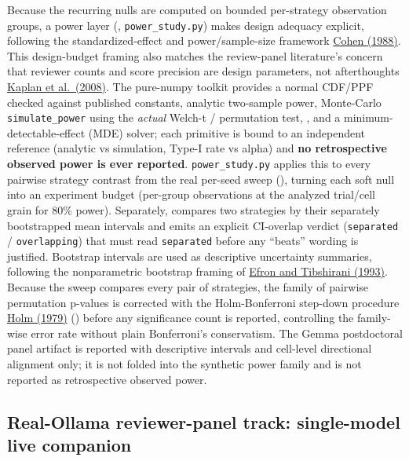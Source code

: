 \documentclass[
]{article}
\begin{document}
Because the recurring nulls are computed on bounded per-strategy
observation groups, a power layer (,
\texttt{power\_study.py}) makes design adequacy explicit, following the
standardized-effect and power/sample-size framework
\href{https://archive.org/details/statisticalpower0000cohe}{Cohen
(1988)}. This design-budget framing also matches the review-panel
literature's concern that reviewer counts and score precision are design
parameters, not afterthoughts
\href{https://doi.org/10.1371/journal.pone.0002761}{Kaplan et
al.~(2008)}. The pure-numpy toolkit provides a normal CDF/PPF checked
against published constants, analytic two-sample power, Monte-Carlo
\texttt{simulate\_power} using the \emph{actual} Welch-t / permutation
test, , and a minimum-detectable-effect
(MDE) solver; each primitive is bound to an independent reference
(analytic vs simulation, Type-I rate vs alpha) and \textbf{no
retrospective observed power is ever reported}. \texttt{power\_study.py}
applies this to every pairwise strategy contrast from the real per-seed
sweep (), turning each soft null
into an experiment budget (per-group observations at the analyzed
trial/cell grain for 80\% power). Separately,
 compares two
strategies by their separately bootstrapped mean intervals and emits an
explicit CI-overlap verdict (\texttt{separated} / \texttt{overlapping})
that must read \texttt{separated} before any ``beats'' wording is
justified. Bootstrap intervals are used as descriptive uncertainty
summaries, following the nonparametric bootstrap framing of
\href{https://doi.org/10.1201/9780429246593}{Efron and Tibshirani
(1993)}. Because the sweep compares every pair of strategies, the family
of pairwise permutation p-values is corrected with the Holm-Bonferroni
step-down procedure \href{https://www.jstor.org/stable/4615733}{Holm
(1979)} () before any
significance count is reported, controlling the family-wise error rate
without plain Bonferroni's conservatism. The Gemma postdoctoral panel
artifact is reported with descriptive intervals and cell-level
directional alignment only; it is not folded into the synthetic power
family and is not reported as retrospective observed power.

\subsection{Real-Ollama reviewer-panel track: single-model live
companion}\label{real-ollama-reviewer-panel-track-single-model-live-companion}
\end{document}
